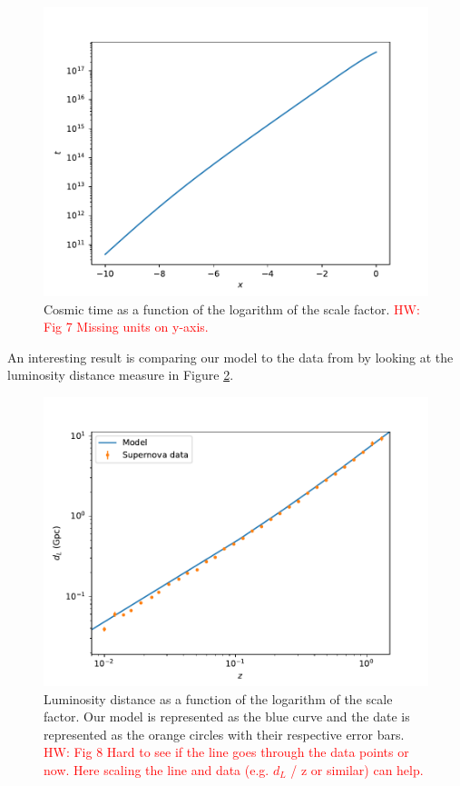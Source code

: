 \documentclass{aa}
\newcommand{\hw}[1]{\textcolor{red}{HW: #1}}
\begin{document}
\begin{figure}[ht]
\centering
\includegraphics[width=\hsize]{figures/t.pdf}
  \caption{Cosmic time as a function of the logarithm of the scale factor. \hw{Fig 7 Missing units on y-axis.}}
     \label{fig:t}
\end{figure}

An interesting result is comparing our model to the data from \cite{Betoule_2014} by looking at the luminosity distance measure in Figure \ref{fig:dL}.

\begin{figure}[ht]
\centering
\includegraphics[width=\hsize]{figures/dL.pdf}
  \caption{Luminosity distance as a function of the logarithm of the scale factor. Our model is represented as the blue curve and the date is represented as the orange circles with their respective error bars. \hw{Fig 8 Hard to see if the line goes through the data points or now. Here scaling the line and data (e.g. $d_L$ / z or similar) can help.}}
     \label{fig:dL}
\end{figure}
\end{document}
